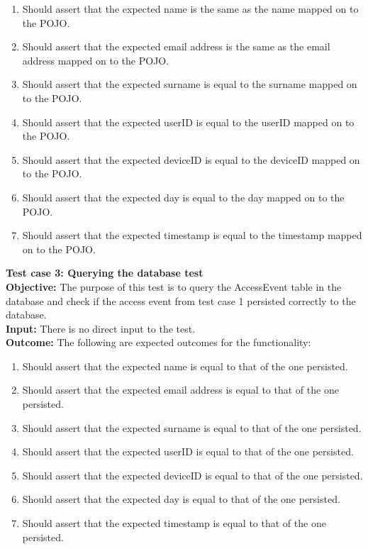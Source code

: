 \documentclass[11pt,a4paper]{article}
\begin{document}
\begin{enumerate}
	\item Should assert that the expected name is the same as the name mapped on to the POJO.
	\item Should assert that the expected email address is the same as the email address mapped on to the POJO.
	\item Should assert that the expected surname is equal to the surname mapped on to the POJO.
	\item Should assert that the expected userID is equal to the userID mapped on to the POJO.
	\item Should assert that the expected deviceID is equal to the deviceID mapped on to the POJO.
	\item Should assert that the expected day is equal to the day mapped on to the POJO.
	\item Should assert that the expected timestamp is equal to the timestamp mapped on to the POJO.\\
\end{enumerate}

\noindent
\textbf{Test case 3: Querying the database test} \\
\textbf{Objective: } The purpose of this test is to query the AccessEvent table in the database and check if the access event from test case 1 persisted correctly to the database. \\
\textbf{Input: } There is no direct input to the test. \\
\textbf{Outcome: } The following are expected outcomes for the functionality:
\begin{enumerate}
	\item Should assert that the expected name is equal to that of the one persisted.
	\item Should assert that the expected email address is equal to that of the one persisted.
	\item Should assert that the expected surname is equal to that of the one persisted.
	\item Should assert that the expected userID is equal to that of the one persisted.
	\item Should assert that the expected deviceID is equal to that of the one persisted.
	\item Should assert that the expected day is equal to that of the one persisted.
	\item Should assert that the expected timestamp is equal to that of the one persisted.\\
\end{enumerate}
\end{document}
